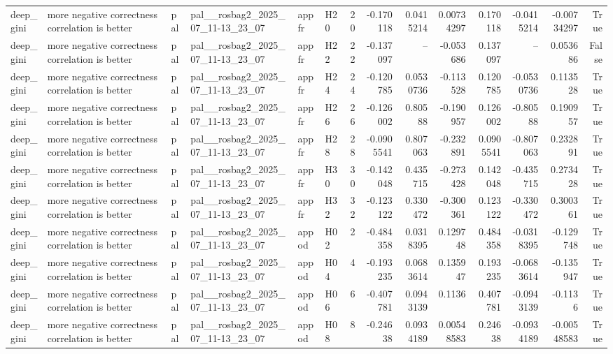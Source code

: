 \begin{longtable}{llllllrrrrrrrr}
deep\_gini & more negative correctness correlation is better & pal & pal\_\_rosbag2\_2025\_07\_11-13\_23\_07 & appfr & H20 & 20 & -0.170118 & 0.0415214 & 0.00734297 & 0.170118 & -0.0415214 & -0.00734297 & True \\
deep\_gini & more negative correctness correlation is better & pal & pal\_\_rosbag2\_2025\_07\_11-13\_23\_07 & appfr & H22 & 22 & -0.137097 & -- & -0.053686 & 0.137097 & -- & 0.053686 & False \\
deep\_gini & more negative correctness correlation is better & pal & pal\_\_rosbag2\_2025\_07\_11-13\_23\_07 & appfr & H24 & 24 & -0.120785 & 0.0530736 & -0.113528 & 0.120785 & -0.0530736 & 0.113528 & True \\
deep\_gini & more negative correctness correlation is better & pal & pal\_\_rosbag2\_2025\_07\_11-13\_23\_07 & appfr & H26 & 26 & -0.126002 & 0.80588 & -0.190957 & 0.126002 & -0.80588 & 0.190957 & True \\
deep\_gini & more negative correctness correlation is better & pal & pal\_\_rosbag2\_2025\_07\_11-13\_23\_07 & appfr & H28 & 28 & -0.0905541 & 0.807063 & -0.232891 & 0.0905541 & -0.807063 & 0.232891 & True \\
deep\_gini & more negative correctness correlation is better & pal & pal\_\_rosbag2\_2025\_07\_11-13\_23\_07 & appfr & H30 & 30 & -0.142048 & 0.435715 & -0.273428 & 0.142048 & -0.435715 & 0.273428 & True \\
deep\_gini & more negative correctness correlation is better & pal & pal\_\_rosbag2\_2025\_07\_11-13\_23\_07 & appfr & H32 & 32 & -0.123122 & 0.330472 & -0.300361 & 0.123122 & -0.330472 & 0.300361 & True \\
deep\_gini & more negative correctness correlation is better & pal & pal\_\_rosbag2\_2025\_07\_11-13\_23\_07 & appod & H02 & 2 & -0.484358 & 0.0318395 & 0.129748 & 0.484358 & -0.0318395 & -0.129748 & True \\
deep\_gini & more negative correctness correlation is better & pal & pal\_\_rosbag2\_2025\_07\_11-13\_23\_07 & appod & H04 & 4 & -0.193235 & 0.0683614 & 0.135947 & 0.193235 & -0.0683614 & -0.135947 & True \\
deep\_gini & more negative correctness correlation is better & pal & pal\_\_rosbag2\_2025\_07\_11-13\_23\_07 & appod & H06 & 6 & -0.407781 & 0.0943139 & 0.1136 & 0.407781 & -0.0943139 & -0.1136 & True \\
deep\_gini & more negative correctness correlation is better & pal & pal\_\_rosbag2\_2025\_07\_11-13\_23\_07 & appod & H08 & 8 & -0.24638 & 0.0934189 & 0.00548583 & 0.24638 & -0.0934189 & -0.00548583 & True \\

\end{longtable}
